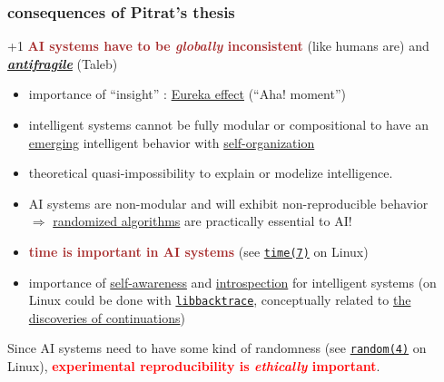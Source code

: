 \documentclass[xcolor=svgnames,final,smaller,a4]{beamer}
\begin{document}
 \begin{frame}
   \frametitle{consequences of Pitrat's thesis}

   \begin{relsize}{+1}
 \textcolor{brown}{\textbf{AI systems have to be \emph{globally}
     inconsistent}} (like humans are) and \href{https://en.wikipedia.org/wiki/Antifragile}{\textbf{\emph{antifragile}}} (Taleb)
   \end{relsize}

   \begin{itemize}
     \item importance of ``insight'' :
       \href{https://en.wikipedia.org/wiki/Eureka\_effect}{Eureka
         effect} (``Aha! moment'')
     \item intelligent systems cannot be fully modular or
       compositional to have an
       \href{https://en.wikipedia.org/wiki/Emergence}{emerging}
       intelligent behavior with
       \href{https://en.wikipedia.org/wiki/Self-organization}{self-organization}
       \item theoretical quasi-impossibility to explain or modelize
         intelligence.
       \item AI systems are non-modular and will exhibit
         non-reproducible behavior \\ $\Rightarrow$
         \href{https://en.wikipedia.org/wiki/Randomized_algorithm}{randomized
           algorithms} are practically essential to AI!
       \item \textcolor{brown}{\textbf{time is important in AI systems}} (see 
         \href{http://man7.org/linux/man-pages/man7/time.7.html}{\texttt{time(7)}} on Linux)

         \item importance of
           \href{https://en.wikipedia.org/wiki/Self-awareness}{self-awareness}
           and
           \href{https://en.wikipedia.org/wiki/Introspection}{introspection}
           for intelligent systems (on Linux could be done with
           \href{https://github.com/ianlancetaylor/libbacktrace}{\texttt{libbacktrace}},
           conceptually related to
           \href{https://dl.acm.org/doi/10.1007/BF01019459}{the
             discoveries of continuations})
   \end{itemize}

   Since AI systems need to have some kind of randomness (see
   \href{http://man7.org/linux/man-pages/man4/random.4.html}{\texttt{random(4)}} on Linux),
   \textcolor{red}{\textbf{experimental reproducibility is \emph{ethically} important}}.
 \end{frame}
\end{document}
